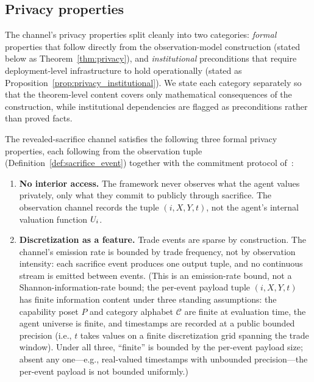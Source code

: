 \subsection{Privacy properties}

The channel's privacy properties split cleanly into two
categories: \emph{formal} properties that follow directly from
the observation-model construction (stated below as
Theorem~\ref{thm:privacy}), and \emph{institutional}
preconditions that require deployment-level infrastructure to
hold operationally (stated as
Proposition~\ref{prop:privacy_institutional}).  We state each
category separately so that the theorem-level content covers
only mathematical consequences of the construction, while
institutional dependencies are flagged as preconditions rather
than proved facts.

\begin{theorem}
\label{thm:privacy}
The revealed-sacrifice channel satisfies the following three
formal privacy properties, each following from the observation
tuple (Definition~\ref{def:sacrifice_event}) together with the
commitment protocol
of~\citep[Definition~6]{lasser2026exo}:

\begin{enumerate}
\item[\textbf{(P1)}] \textbf{No interior access.}  The framework
  never observes what the agent values privately, only what they
  commit to publicly through sacrifice.  The observation channel
  records the tuple $(i, X, Y, t)$, not the agent's internal
  valuation function $U_i$.

\item[\textbf{(P3)}] \textbf{Discretization as a feature.}  Trade
  events are sparse by construction.  The channel's emission rate
  is bounded by trade frequency, not by observation intensity:
  each sacrifice event produces one output tuple, and no
  continuous stream is emitted between events.  (This is an
  emission-rate bound, not a Shannon-information-rate bound; the
  per-event payload tuple $(i, X, Y, t)$ has finite information
  content under three standing assumptions: the capability
  poset $P$ and category alphabet $\mathcal{C}$ are finite at
  evaluation time, the agent universe is finite, and timestamps
  are recorded at a public bounded precision (i.e., $t$ takes
  values on a finite discretization grid spanning the trade
  window).  Under all three, ``finite'' is bounded by the
  per-event payload size; absent any one---e.g., real-valued
  timestamps with unbounded precision---the per-event payload
  is not bounded uniformly.)


\end{enumerate}
\end{theorem}
